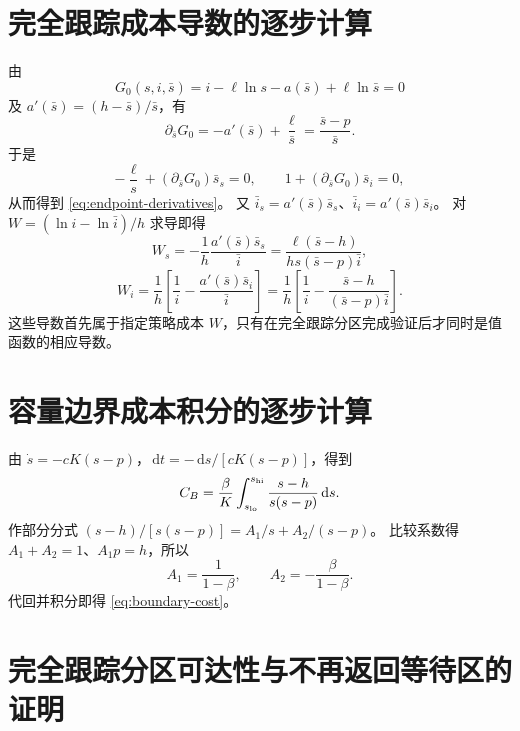 \documentclass[11pt,a4paper,UTF8]{ctexart}
\theoremstyle{definition}
\newcommand{\dd}{\,\mathrm d}
\begin{document}
\appendix
\section{完全跟踪成本导数的逐步计算}
\label{app:W-derivatives}
由
\[
G_0(s,i,\bar s)=i-\ell\ln s-a(\bar s)+\ell\ln\bar s=0
\]
及 $a'(\bar s)=(h-\bar s)/\bar s$，有
\[
\partial_{\bar s}G_0=-a'(\bar s)+\frac\ell{\bar s}
=\frac{\bar s-p}{\bar s}.
\]
于是
\[
-\frac\ell s+(\partial_{\bar s}G_0)\bar s_s=0,\qquad
1+(\partial_{\bar s}G_0)\bar s_i=0,
\]
从而得到 \eqref{eq:endpoint-derivatives}。
又 $\bar i_s=a'(\bar s)\bar s_s$、$\bar i_i=a'(\bar s)\bar s_i$。
对 $W=(\ln i-\ln\bar i)/h$ 求导即得
\[
W_s=-\frac1h\frac{a'(\bar s)\bar s_s}{\bar i}
=\frac{\ell(\bar s-h)}{hs(\bar s-p)\bar i},
\]
\[
W_i=\frac1h\left[\frac1i-\frac{a'(\bar s)\bar s_i}{\bar i}\right]
=\frac1h\left[\frac1i-\frac{\bar s-h}{(\bar s-p)\bar i}\right].
\]
这些导数首先属于指定策略成本 $W$，只有在完全跟踪分区完成验证后才同时是值函数的相应导数。

\section{容量边界成本积分的逐步计算}
\label{app:capacity-integral}
由 $\dot s=-cK(s-p)$，$\dd t=-\dd s/[cK(s-p)]$，得到
\[
C_B=\frac \beta K\int_{s_{\rm lo}}^{s_{\rm hi}}\frac{s-h}{s(s-p)}\dd s.
\]
作部分分式 $(s-h)/[s(s-p)]=A_1/s+A_2/(s-p)$。
比较系数得 $A_1+A_2=1$、$A_1p=h$，所以
\[
A_1=\frac1{1-\beta},\qquad A_2=-\frac \beta{1-\beta}.
\]
代回并积分即得 \eqref{eq:boundary-cost}。

\section{完全跟踪分区可达性与不再返回等待区的证明}
\label{app:tracking-region-proof}
\end{document}
